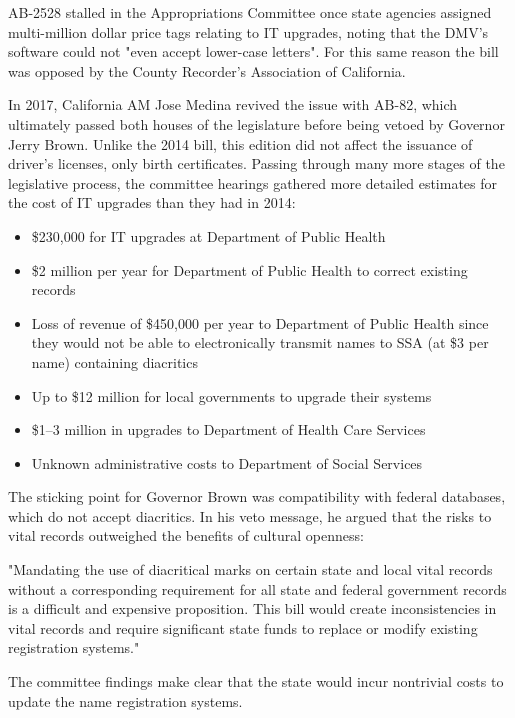 AB-2528 stalled in the Appropriations Committee once state agencies assigned
multi-million dollar price tags relating to IT upgrades, noting that the DMV's
software could not "even accept lower-case letters". For this same reason the
bill was opposed by the County Recorder's Association of California.

In 2017, California AM Jose Medina revived the issue with AB-82, which
ultimately passed both houses of the legislature before being vetoed by Governor
Jerry Brown. Unlike the 2014 bill, this edition did not affect the issuance of
driver's licenses, only birth certificates. Passing through many more stages of
the legislative process, the committee hearings gathered more detailed estimates
for the cost of IT upgrades than they had in 2014:

\begin{itemize}

\item \$230,000 for IT upgrades at Department of Public Health
\item \$2 million per year for Department of Public Health to correct existing
records
\item Loss of revenue of \$450,000 per year to Department of Public Health since
they would not be able to electronically transmit names to SSA (at \$3 per name)
containing diacritics
\item Up to \$12 million for local governments to upgrade their systems
\item \$1--3 million in upgrades to Department of Health Care Services
\item Unknown administrative costs to Department of Social Services

\end{itemize}

The sticking point for Governor Brown was compatibility with federal databases,
which do not accept diacritics. In his veto message, he argued that the risks to
vital records outweighed the benefits of cultural openness:

"Mandating the use of diacritical marks on certain state and local vital records
without a corresponding requirement for all state and federal government records
is a difficult and expensive proposition. This bill would create inconsistencies
in vital records and require significant state funds to replace or modify
existing registration systems."

The committee findings make clear that the state would incur nontrivial costs to
update the name registration systems.
